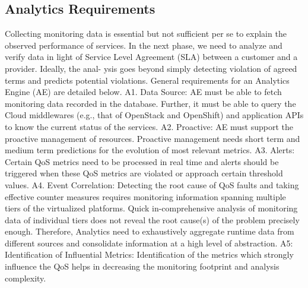 \subsection{Analytics Requirements}

Collecting monitoring data is essential but not sufficient per se to explain the observed performance of services. In the next phase, we need to analyze and verify data in light of Service Level Agreement (SLA) between a customer and a provider. Ideally, the anal- ysis goes beyond simply detecting violation of agreed terms and predicts potential violations. General requirements for an Analytics Engine (AE) are detailed below. A1. Data Source: AE must be able to fetch monitoring data recorded in the database. Further, it must be able to query the Cloud middlewares (e.g., that of OpenStack and OpenShift) and application APIs to know the current status of the services. A2. Proactive: AE must support the proactive management of resources. Proactive management needs short term and medium term predictions for the evolution of most relevant metrics. A3. Alerts: Certain QoS metrics need to be processed in real time and alerts should be triggered when these QoS metrics are violated or approach certain threshold values. A4. Event Correlation: Detecting the root cause of QoS faults and taking effective counter measures requires monitoring information spanning multiple tiers of the virtualized platforms. Quick in-comprehensive analysis of monitoring data of individual tiers does not reveal the root cause(s) of the problem precisely enough. Therefore, Analytics need to exhaustively aggregate runtime data from different sources and consolidate information at a high level of abstraction. A5: Identification of Influential Metrics: Identification of the metrics which strongly influence the QoS helps in decreasing the monitoring footprint and analysis complexity.

